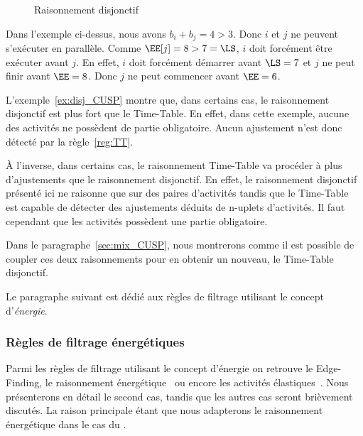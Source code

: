 \begin{ex}
\begin{figure}[htb!]
  \caption{Raisonnement disjonctif}
  \label{fig:disj_CUSP}
\end{figure}
Dans l'exemple ci-dessus, nous avons $b_i+b_j=4 > 3$. Donc $i$ et $j$
ne peuvent s'exécuter en parallèle. Comme $\EE[j] = 8 > 7=\LS$, $i$
doit forcément être exécuter avant $j$. En effet, $i$ doit forcément
démarrer avant $\LS=7$ et $j$ ne peut finir avant $\EE=8$. Donc $j$ ne
peut commencer avant $\EE=6$.
\end{ex}

L'exemple~\ref{ex:disj_CUSP} montre que, dans certains cas, le
raisonnement disjonctif est plus fort que le Time-Table. En effet,
dans cette exemple, aucune des activités ne possèdent de partie
obligatoire. Aucun ajustement n'est donc détecté par la
règle~\ref{reg:TT}. 

{\`A} l'inverse, dans certains cas, le raisonnement Time-Table va
procéder à plus d'ajustements que le raisonnement disjonctif. En
effet, le raisonnement disjonctif présenté ici ne raisonne que sur des
paires d'activités tandis que le Time-Table est capable de détecter
des ajustements déduits de n-uplets d'activités. Il faut cependant que
les activités possèdent une partie obligatoire.

Dans le paragraphe~\ref{sec:mix_CUSP}, nous montrerons comme il est
possible de coupler ces deux raisonnements pour en obtenir un nouveau,
le Time-Table disjonctif. 

Le paragraphe suivant est dédié aux règles de filtrage utilisant le
concept d'{\it énergie}. 
 
\subsubsection{Règles de filtrage énergétiques}
 \label{sec:nrj_CUSP}
Parmi les règles de filtrage utilisant le concept d'énergie on
retrouve le Edge-Finding\cite{VilimEF,theseNuijten}, le raisonnement
énergétique~\cite{RELopez} ou encore les activités
élastiques~\cite{BLPN}.  Nous présenterons en détail le second cas,
tandis que les autres cas seront brièvement discutés. La raison
principale étant que nous adapterons le raisonnement énergétique dans
le cas du \CECSP.

